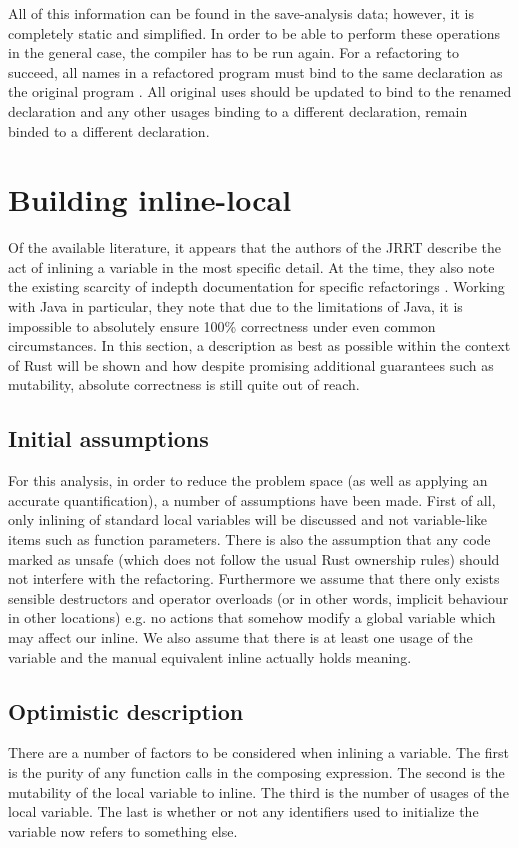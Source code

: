 All of this information can be found in the save-analysis data; however, it is completely static and simplified. In order to be able to perform these operations in the general case, the compiler has to be run again. For a refactoring to succeed, all names in a refactored program must bind to the same declaration as the original program \cite{schafer2010specification}. All original uses should be updated to bind to the renamed declaration and any other usages binding to a different declaration, remain binded to a different declaration.

\section{Building inline-local}\label{S:buildIL}
Of the available literature, it appears that the authors of the JRRT describe the act of inlining a variable in the most specific detail. At the time, they also note the existing scarcity of indepth documentation for specific refactorings \cite{schafer2010specification}. Working with Java in particular, they note that due to the limitations of Java, it is impossible to absolutely ensure 100\% correctness under even common circumstances. In this section, a description as best as possible within the context of Rust will be shown and how despite promising additional guarantees such as mutability, absolute correctness is still quite out of reach.

\subsection{Initial assumptions}
For this analysis, in order to reduce the problem space (as well as applying an accurate quantification), a number of assumptions have been made. First of all, only inlining of standard local variables will be discussed and not variable-like items such as function parameters. There is also the assumption that any code marked as unsafe (which does not follow the usual Rust ownership rules) should not interfere with the refactoring. Furthermore we assume that there only exists sensible destructors and operator overloads (or in other words, implicit behaviour in other locations) e.g. no actions that somehow modify a global variable which may affect our inline. We also assume that there is at least one usage of the variable and the manual equivalent inline actually holds meaning.

\subsection{Optimistic description}
There are a number of factors to be considered when inlining a variable. The first is the purity of any function calls in the composing expression. The second is the mutability of the local variable to inline. The third is the number of usages of the local variable. The last is whether or not any identifiers used to initialize the variable now refers to something else.

